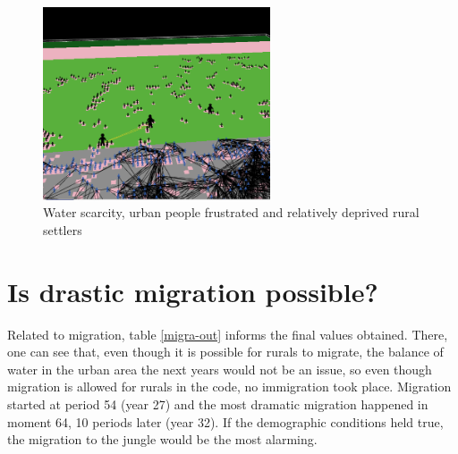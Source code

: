 \documentclass{article}
\begin{document}
\begin{itemize}
\begin{figure}[h]
  \centering
  \includegraphics[width=0.6\textwidth]{esc4}
  \caption{Water scarcity, urban people frustrated and relatively deprived rural settlers}
  \label{network}
\end{figure}


\end {itemize}


\clearpage

\section {Is drastic migration possible?}

Related to migration, table \ref{migra-out} informs the final values obtained. There, one can see that, even though it is possible for rurals to migrate, the balance of water in the urban area the next years would not be an issue, so even though migration is allowed for rurals in the code, no immigration took place. Migration started at period 54 (year 27) and the most dramatic migration happened in moment 64, 10 periods later (year 32). If the demographic conditions held true, the migration to the jungle would be the most alarming.
\end{document}

